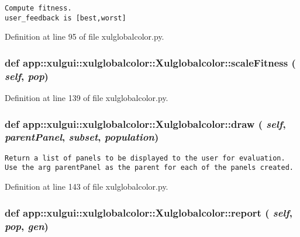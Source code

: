 \footnotesize\begin{verbatim}
Compute fitness.
user_feedback is [best,worst]
\end{verbatim}
\normalsize
 

Definition at line 95 of file xulglobalcolor.py.
\subsubsection{\setlength{\rightskip}{0pt plus 5cm}def app::xulgui::xulglobalcolor::Xulglobalcolor::scaleFitness ( {\em self},  {\em pop})}\label{classapp_1_1xulgui_1_1xulglobalcolor_1_1Xulglobalcolor_92d08633462e87b779506ffaef921b25}




Definition at line 139 of file xulglobalcolor.py.
\subsubsection{\setlength{\rightskip}{0pt plus 5cm}def app::xulgui::xulglobalcolor::Xulglobalcolor::draw ( {\em self},  {\em parentPanel},  {\em subset},  {\em population})}\label{classapp_1_1xulgui_1_1xulglobalcolor_1_1Xulglobalcolor_fe7f1607f050f9f5d1a127fdee7120f4}




\footnotesize\begin{verbatim}
Return a list of panels to be displayed to the user for evaluation.
Use the arg parentPanel as the parent for each of the panels created.
\end{verbatim}
\normalsize
 

Definition at line 143 of file xulglobalcolor.py.
\subsubsection{\setlength{\rightskip}{0pt plus 5cm}def app::xulgui::xulglobalcolor::Xulglobalcolor::report ( {\em self},  {\em pop},  {\em gen})}\label{classapp_1_1xulgui_1_1xulglobalcolor_1_1Xulglobalcolor_66771359c8f9c45ba8cc1d28b484e513}




